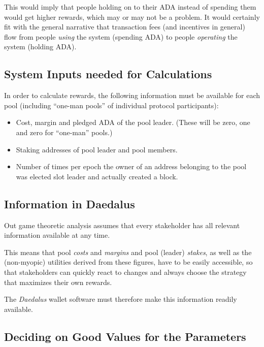 \documentclass[11pt,a4paper]{article}
\begin{document}
This would imply that people holding on to their ADA instead of spending
them would get higher rewards, which may or may not be a problem. It
would certainly fit with the general narrative that transaction fees
(and incentives in general) flow from people \emph{using} the system
(spending ADA) to people \emph{operating} the system (holding ADA).

\subsection{System Inputs needed for Calculations}
\label{system-inputs-needed-for-calculations}

In order to calculate rewards, the following information must be
available for each pool (including ``one-man pools'' of individual
protocol participants):

\begin{itemize}
\item
  Cost, margin and pledged ADA of the pool leader. (These will be zero,
  one and zero for ``one-man'' pools.)
\item
  Staking addresses of pool leader and pool members.
\item
  Number of times per epoch the owner of an address belonging to the
  pool was elected slot leader and actually created a block.
\end{itemize}

\subsection{Information in Daedalus}
\label{information-in-daedalus}

Out game theoretic analysis assumes that every stakeholder has all
relevant information available at any time.

This means that pool \emph{costs} and \emph{margins} and pool (leader)
\emph{stakes}, as well as the (non-myopic) utilities derived from these
figures, have to be easily accessible, so that stakeholders can quickly
react to changes and always choose the strategy that maximizes their own
rewards.

The \emph{Daedalus} wallet software must therefore make this information
readily available.

\subsection{Deciding on Good Values for the Parameters}
\label{deciding-on-good-values-for-the-parameters}
\end{document}
